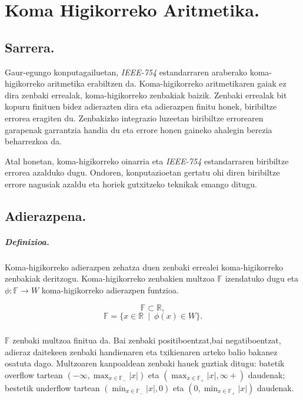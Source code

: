 \chapter{Koma Higikorreko Aritmetika.}
\label{sec:4.4}

\section{Sarrera.}

Gaur-egungo konputagailuetan, \emph{IEEE-754} estandarraren araberako koma-higikorreko aritmetika erabiltzen da. Koma-higikorreko aritmetikaren gaiak ez dira zenbaki errealak, koma-higikorreko zenbakiak baizik. Zenbaki errealak bit kopuru finituen bidez adierazten dira eta adierazpen finitu honek, biribiltze errorea eragiten du. Zenbakizko integrazio luzeetan  biribiltze errorearen garapenak garrantzia handia du eta errore honen gaineko ahalegin berezia beharrezkoa da.  
  
Atal honetan, koma-higikorreko oinarria eta \emph{IEEE-754} estandarraren biribiltze errorea azalduko dugu. Ondoren, konputazioetan gertatu ohi diren biribiltze errore nagusiak azaldu eta horiek gutxitzeko teknikak emango ditugu. 

\section{Adierazpena.}

\paragraph*{\textbf{Definizioa.}} Koma-higikorreko adierazpen zehatza duen zenbaki errealei koma-higikorreko zenbakiak deritzogu. Koma-higikorreko zenbakien multzoa ${\mathbb{F}}$ izendatuko dugu eta $\phi:\mathbb{F} \rightarrow W$ koma-higikorreko adierazpen funtzioa. 

\begin{equation*}
\mathbb{F}\subset \mathbb{R},
\end{equation*}
\begin{equation}
\mathbb{F}=\{x \in \mathbb{R} \ \mid \ \phi(x) \in W\}.
\end{equation}

\paragraph*{}$\mathbb{F}$ zenbaki multzoa finitua da. Bai zenbaki positiboentzat,bai negatiboentzat, adieraz daitekeen zenbaki handienaren eta txikienaren arteko balio bakanez osatuta dago. Multzoaren kanpoaldean zenbaki hauek guztiak ditugu: batetik overflow tartean $(-\infty,\max_{x \in \mathbb{F_{-}}}|x|)$  eta $(\max_{x \in \mathbb{F_{+}}}|x|,\infty+)$ daudenak; bestetik underflow tartean  $(\min_{x \in \mathbb{F_{-}}}|x|,0)$ eta $(0,\min_{x \in \mathbb{F_{+}}}|x|)$ daudenak. 

